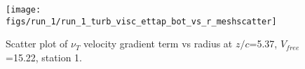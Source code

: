 \begin{figure}[H]
\centering
\texttt{[image: figs/run\_1/run\_1\_turb\_visc\_ettap\_bot\_vs\_r\_meshscatter]}
\caption{Scatter plot of $\nu_T$ velocity gradient term vs radius at $z/c$=5.37, $V_{free}$=15.22, station 1.}
\label{fig:run_1_turb_visc_ettap_bot_vs_r_meshscatter}
\end{figure}


